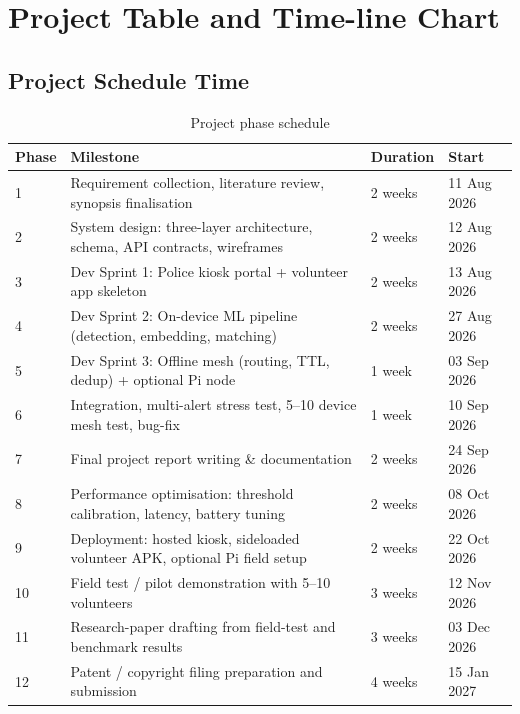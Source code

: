 \documentclass[12pt,a4paper,oneside]{report}
\begin{document}
\section{Project Table and Time-line Chart}

\subsection{Project Schedule Time}

\begin{table}[H]
\centering
\caption{Project phase schedule}
\label{tab:schedule}
\begin{tabular}{|p{1.2cm}|p{7.2cm}|p{2.1cm}|p{2.5cm}|}
\hline
\textbf{Phase} & \textbf{Milestone} & \textbf{Duration} & \textbf{Start} \\
\hline
1  & Requirement collection, literature review, synopsis finalisation & 2 weeks & 11 Aug 2026 \\ \hline
2  & System design: three-layer architecture, schema, API contracts, wireframes & 2 weeks & 12 Aug 2026 \\ \hline
3  & Dev Sprint 1: Police kiosk portal + volunteer app skeleton & 2 weeks & 13 Aug 2026 \\ \hline
4  & Dev Sprint 2: On-device ML pipeline (detection, embedding, matching) & 2 weeks & 27 Aug 2026 \\ \hline
5  & Dev Sprint 3: Offline mesh (routing, TTL, dedup) + optional Pi node & 1 week & 03 Sep 2026 \\ \hline
6  & Integration, multi-alert stress test, 5--10 device mesh test, bug-fix & 1 week & 10 Sep 2026 \\ \hline
7  & Final project report writing \& documentation & 2 weeks & 24 Sep 2026 \\ \hline
8  & Performance optimisation: threshold calibration, latency, battery tuning & 2 weeks & 08 Oct 2026 \\ \hline
9  & Deployment: hosted kiosk, sideloaded volunteer APK, optional Pi field setup & 2 weeks & 22 Oct 2026 \\ \hline
10 & Field test / pilot demonstration with 5--10 volunteers & 3 weeks & 12 Nov 2026 \\ \hline
11 & Research-paper drafting from field-test and benchmark results & 3 weeks & 03 Dec 2026 \\ \hline
12 & Patent / copyright filing preparation and submission & 4 weeks & 15 Jan 2027 \\
\hline
\end{tabular}
\end{table}
\end{document}
